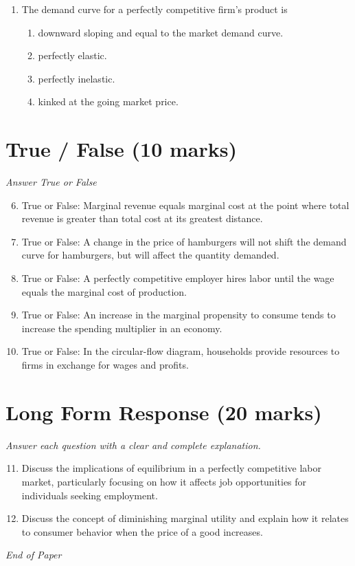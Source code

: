 \documentclass[12pt]{article}
\begin{document}
\begin{enumerate}[label=\arabic*.]
\begin{enumerate}[label=(\alph*)]
    \item Lower taxes on research and development of new technology
    \item Higher taxes on household income
\end{enumerate}
\item The demand curve for a perfectly competitive firm's product is
\begin{enumerate}[label=(\alph*)]
    \item downward sloping and equal to the market demand curve.
    \item perfectly elastic.
    \item perfectly inelastic.
    \item kinked at the going market price.
\end{enumerate}
\end{enumerate}

\section*{True / False (10 marks)}
\textit{Answer True or False}
\begin{enumerate}[label=\arabic*.]
\setcounter{enumi}{5}
\item True or False: Marginal revenue equals marginal cost at the point where total revenue is greater than total cost at its greatest distance.
\item True or False: A change in the price of hamburgers will not shift the demand curve for hamburgers, but will affect the quantity demanded.
\item True or False: A perfectly competitive employer hires labor until the wage equals the marginal cost of production.
\item True or False: An increase in the marginal propensity to consume tends to increase the spending multiplier in an economy.
\item True or False: In the circular-flow diagram, households provide resources to firms in exchange for wages and profits.
\end{enumerate}

\section*{Long Form Response (20 marks)}
\textit{Answer each question with a clear and complete explanation.}
\begin{enumerate}[label=\arabic*.]
\setcounter{enumi}{10}
\item Discuss the implications of equilibrium in a perfectly competitive labor market, particularly focusing on how it affects job opportunities for individuals seeking employment.
\item Discuss the concept of diminishing marginal utility and explain how it relates to consumer behavior when the price of a good increases.
\end{enumerate}

\vfill
\noindent\textit{End of Paper}
\end{document}
